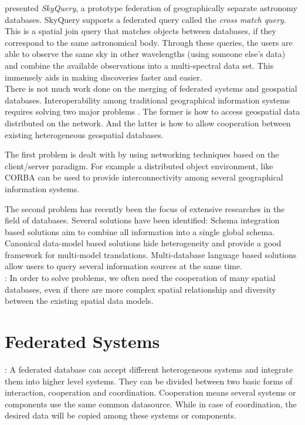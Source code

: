 \documentclass[12pt,a4paper]{report}
\newcommand{\term}{\textit}
\begin{document}
	\citet{Malik} presented \term{SkyQuery}, a prototype federation of 
	geographically separate astronomy databases. SkyQuery supports a federated 
	query called the \term{cross match query}. This is a spatial join query 
	that matches objects between databases, if they correspond to the same 
	astronomical body. Through these queries, the users are able to observe the 
	same sky in other wavelengths (using someone else’s data) and combine the 
	available observations into a multi-spectral data set. This immensely aids 
	in making discoveries faster and easier.
	\\

	There is not much work done on the merging of federated systems and geospatial databases.
	Interoperability among traditional geographical information systems requires solving two major problems \citep{Gong}. The former is how to access geospatial data distributed on the network. And the latter is how to allow cooperation between existing heterogeneous geospatial databases.
	\par
	The first problem is dealt with by using networking techniques based on the client/server paradigm. For example a distributed object environment, like CORBA can be used to provide interconnectivity among several geographical information systems.
	\par
	The second problem has recently been the focus of extensive researches in the field of databases. Several solutions have been identified: Schema integration based solutions aim to combine all information into a single global schema. Canonical data-model based solutions hide heterogeneity and provide a good framework for multi-model translations. Multi-database language based solutions allow users to query several information sources at the same time.
	\\ 

	\citep{Gong}: In order to solve problems, we often need the cooperation of many spatial databases, even if there are more complex spatial relationship and diversity between the existing spatial data models.
	\\



	\chapter{Federated Systems}
	\label{sec:fed_sys}
	
	\citep{Jian}: A federated database can accept different heterogeneous systems and integrate them into higher level systems. They can be divided between two basic forms of interaction, cooperation and coordination. Cooperation means several systems or components use the same common datasource. While in case of coordination, the desired data will be copied among these systems or components.
	\\
\end{document}
